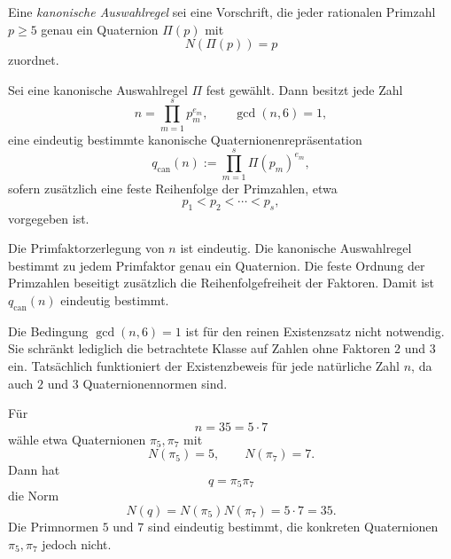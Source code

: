 \begin{definition}
	Eine \emph{kanonische Auswahlregel} sei eine Vorschrift, die jeder rationalen Primzahl $p\ge 5$ genau ein Quaternion $\Pi(p)$ mit
	\[
	N(\Pi(p))=p
	\]
	zuordnet.
\end{definition}

\begin{korollar}
	Sei eine kanonische Auswahlregel $\Pi$ fest gewählt. Dann besitzt jede Zahl
	\[
	n=\prod_{m=1}^s p_m^{e_m},
	\qquad \gcd(n,6)=1,
	\]
	eine eindeutig bestimmte kanonische Quaternionenrepräsentation
	\[
	q_{\mathrm{can}}(n):=\prod_{m=1}^s \Pi(p_m)^{e_m},
	\]
	sofern zusätzlich eine feste Reihenfolge der Primzahlen, etwa
	\[
	p_1< p_2<\cdots < p_s,
	\]
	vorgegeben ist.
\end{korollar}

\begin{beweis}
	Die Primfaktorzerlegung von $n$ ist eindeutig. Die kanonische Auswahlregel bestimmt zu jedem Primfaktor genau ein Quaternion. Die feste Ordnung der Primzahlen beseitigt zusätzlich die Reihenfolgefreiheit der Faktoren. Damit ist $q_{\mathrm{can}}(n)$ eindeutig bestimmt.
\end{beweis}

\begin{bemerkung}
	Die Bedingung $\gcd(n,6)=1$ ist für den reinen Existenzsatz nicht notwendig. Sie schränkt lediglich die betrachtete Klasse auf Zahlen ohne Faktoren $2$ und $3$ ein. Tatsächlich funktioniert der Existenzbeweis für jede natürliche Zahl $n$, da auch $2$ und $3$ Quaternionennormen sind.
\end{bemerkung}

\begin{beispiel}
	Für
	\[
	n=35=5\cdot 7
	\]
	wähle etwa Quaternionen $\pi_5,\pi_7$ mit
	\[
	N(\pi_5)=5,\qquad N(\pi_7)=7.
	\]
	Dann hat
	\[
	q=\pi_5\pi_7
	\]
	die Norm
	\[
	N(q)=N(\pi_5)N(\pi_7)=5\cdot 7=35.
	\]
	Die Primnormen $5$ und $7$ sind eindeutig bestimmt, die konkreten Quaternionen $\pi_5,\pi_7$ jedoch nicht.
\end{beispiel}